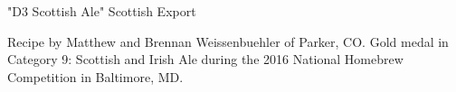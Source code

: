 \begin{recipe}{"D3 Scottish Ale" Scottish Export} %

\begin{aboutblock}
Recipe by Matthew and Brennan Weissenbuehler of Parker, CO. Gold medal in
Category 9: Scottish and Irish Ale during the 2016 National Homebrew Competition
in Baltimore, MD. \sourceaha
\end{aboutblock}


\begin{methodandtiming}

\begin{mashsteps}
\end{mashsteps}

\begin{fermentationsteps}
\end{fermentationsteps}

\end{methodandtiming}

\recipebreak

\begin{ingredientsblock}

\begin{malts}
\end{malts}

\begin{hops}
\end{hops}


\end{ingredientsblock}

\end{recipe}
